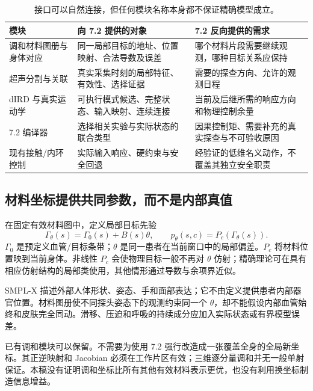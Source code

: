 \documentclass[UTF8,fontset=fandol,11pt,a4paper]{ctexart}
\theoremstyle{definition}\newtheorem{definition}[theorem]{定义}\newtheorem{assumption}[theorem]{条件}
\numberwithin{equation}{section}
\begin{document}
\begin{table}[ht]\centering\small
\begin{tabularx}{\linewidth}{p{.23\linewidth}YY}
\toprule
模块 & 向 7.2 提供的对象 & 7.2 反向提供的需求\\\midrule
调和材料图册与身体对应 & 同一局部目标的地址、位置映射、合法导数及误差 & 哪个材料片段需要继续观测，哪种目标关系应保持\\
超声分割与关联 & 真实采集时刻的局部特征、有效性、选择证据 & 需要的探查方向、允许的观测日程\\
dIRD 与真实运动学 & 可执行模式候选、完整状态、输入映射、连续连接 & 当前及后继所需的响应方向和物理控制余量\\
7.2 编译器 & 选择相关实验与实际状态的联合类型 & 因果控制矩、需要补充的真实探查与不可验收原因\\
现有接触/内环控制 & 实际输入响应、硬约束与安全回退 & 经验证的低维名义动作，不覆盖其独立安全职责\\
\bottomrule
\end{tabularx}
\caption{接口可以自然连接，但任何模块名称本身都不保证精确模型成立。}
\end{table}

\subsection{材料坐标提供共同参数，而不是内部真值}
在固定有效材料图中，定义局部目标先验
\begin{equation}
\Gamma_\theta(s)=\Gamma_0(s)+B(s)\theta,
\qquad p_\theta(s,c)=P_c(\Gamma_\theta(s)).
\label{eq:materialtarget}
\end{equation}
$\Gamma_0$ 是预定义血管/目标条带；$\theta$ 是同一患者在当前窗口中的局部偏差。$P_c$ 将材料位置映到当前身体。非线性 $P_c$ 会使物理目标一般不再对 $\theta$ 仿射；精确理论可在具有相应仿射结构的局部类使用，其他情形通过导数与余项界近似。

SMPL-X 描述外部人体形状、姿态、手和面部表达\cite{smplx}；它不由定义提供患者内部器官位置。材料图册使不同探头姿态下的观测约束同一个 $\theta$，却不能假设内部血管始终和皮肤完全同动。滑移、压迫和呼吸的持续成分应加入实际状态或有界模型误差。

已有调和模块可以保留。不需要为使用 7.2 强行改造成一张覆盖全身的全局新坐标。其正逆映射和 Jacobian 必须在工作片区有效；三维逐分量调和并无一般单射保证\cite{laugesen}。本稿没有证明调和坐标比所有其他有效材料表示更优，也没有利用换坐标制造信息增益。
\end{document}

